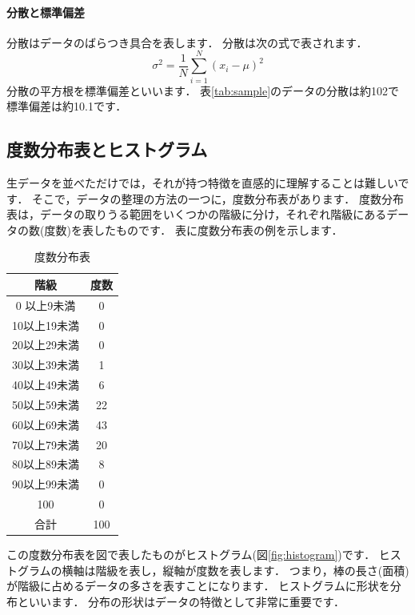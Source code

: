 \documentclass[12pt, a4j]{jreport}
\begin{document}
\paragraph{分散と標準偏差}
分散はデータのばらつき具合を表します．
分散は次の式で表されます．
\begin{equation}
    \sigma^2 = \frac{1}{N} \sum_{i=1}^{N} (x_i - \mu)^2
\end{equation}
分散の平方根を標準偏差といいます．
表\ref{tab:sample}のデータの分散は約102で標準偏差は約10.1です．

\subsection{度数分布表とヒストグラム}

生データを並べただけでは，それが持つ特徴を直感的に理解することは難しいです．
そこで，データの整理の方法の一つに，度数分布表があります．
度数分布表は，データの取りうる範囲をいくつかの階級に分け，それぞれ階級にあるデータの数(度数)を表したものです．
表に度数分布表の例を示します．

\begin{table}[htb]
    \centering
    \caption{度数分布表}
    \begin{tabular}{c|c}
     階級          & 度数 \\ \hline
     0 以上9未満   & 0 \\
     10以上19未満  & 0 \\
     20以上29未満  & 0 \\
     30以上39未満  & 1 \\
     40以上49未満  & 6 \\
     50以上59未満  & 22\\
     60以上69未満  & 43\\
     70以上79未満  & 20\\
     80以上89未満  & 8 \\
     90以上99未満  & 0 \\
     100           & 0 \\
     合計          & 100
    \end{tabular}
    \label{tab:hist}
\end{table}

この度数分布表を図で表したものがヒストグラム(図\ref{fig:histogram})です．
ヒストグラムの横軸は階級を表し，縦軸が度数を表します．
つまり，棒の長さ(面積)が階級に占めるデータの多さを表すことになります．
ヒストグラムに形状を分布といいます．
分布の形状はデータの特徴として非常に重要です．
\end{document}
